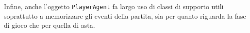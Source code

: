 %
%         
%         
%
%



Infine, anche l'oggetto \texttt{PlayerAgent} fa largo uso di classi di supporto utili soprattutto a memorizzare gli eventi della partita, sia per quanto riguarda la fase di gioco che per quella di asta.
